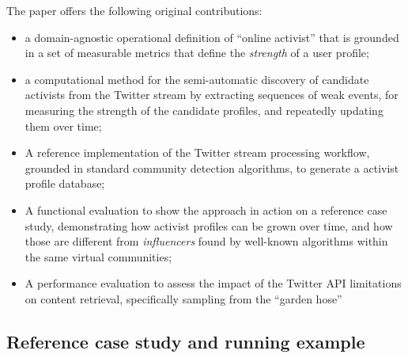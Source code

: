 \documentclass[runningheads]{llncs}
\begin{document}
The paper offers the following original contributions:

\begin{itemize}
\item a domain-agnostic operational definition of ``online activist'' that is grounded in a set of measurable metrics that define the \textit{strength} of a user profile;

\item a computational method for the semi-automatic discovery of candidate activists from the Twitter stream by extracting sequences of weak events, for measuring the strength of the candidate profiles, and repeatedly updating them over time;

\item A reference implementation of the Twitter stream processing workflow, grounded in standard community detection algorithms, to generate a activist profile database;

\item A functional evaluation to show the approach in action on a reference case study, demonstrating how activist profiles can be grown over time, and how those are different from \textit{influencers} found by well-known algorithms within the same virtual communities;

\item A performance evaluation to assess the impact of the Twitter API limitations on content retrieval, specifically sampling from the ``garden hose'' 

\end{itemize}

\subsection{Reference case study and running example}

\end{document}
